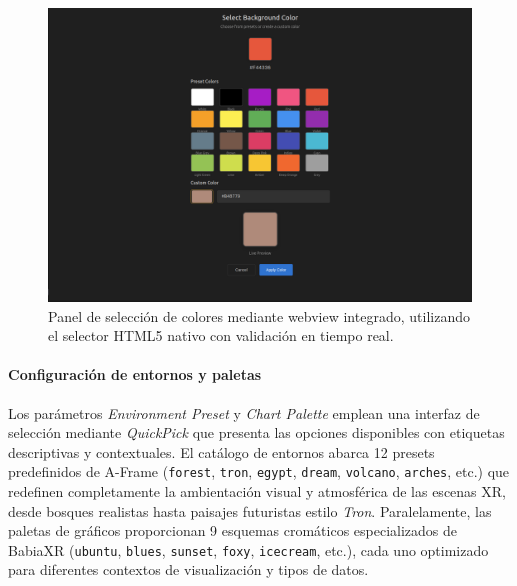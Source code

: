 \documentclass[a4paper, 12pt]{book}
\begin{document}
\begin{figure}[H]
\centering
\includegraphics[width=1\linewidth]{img/ui-color-picker-panel.png}
\caption{Panel de selección de colores mediante webview integrado, utilizando el selector HTML5 nativo con validación en tiempo real.}
\label{fig:ui-color-picker-panel}
\end{figure}


\paragraph{Configuración de entornos y paletas}
Los parámetros \emph{Environment Preset} y \emph{Chart Palette} emplean una interfaz de selección mediante \emph{QuickPick} que presenta las opciones disponibles con etiquetas descriptivas y contextuales. El catálogo de entornos abarca 12 presets predefinidos de A-Frame (\texttt{forest}, \texttt{tron}, \texttt{egypt}, \texttt{dream}, \texttt{volcano}, \texttt{arches}, etc.) que redefinen completamente la ambientación visual y atmosférica de las escenas XR, desde bosques realistas hasta paisajes futuristas estilo \emph{Tron}. Paralelamente, las paletas de gráficos proporcionan 9 esquemas cromáticos especializados de BabiaXR (\texttt{ubuntu}, \texttt{blues}, \texttt{sunset}, \texttt{foxy}, \texttt{icecream}, etc.), cada uno optimizado para diferentes contextos de visualización y tipos de datos.
\end{document}
